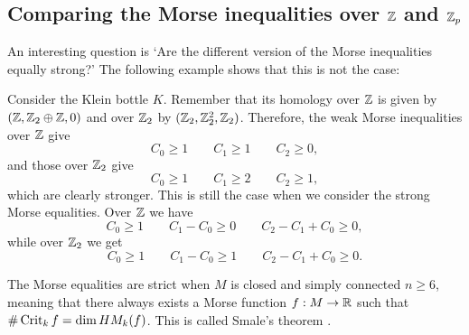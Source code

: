 \subsection{Comparing the Morse inequalities over $\Z$ and $\Z_p$}

An interesting question is `Are the different version of the Morse inequalities equally strong?'
The following example shows that this is not the case:

\begin{eg}
    Consider the Klein bottle $K$.
    Remember that its homology over $\Z$ is given by $(\Z, \Z_2 \oplus \Z, 0)$ and over $ \Z_2$ by $(\Z_2, \Z_2^2, \Z_2)$.
    Therefore, the weak Morse inequalities over $\Z$ give
    \[
    C_0 \ge 1 \qquad C_1 \ge 1 \qquad C_2 \ge 0
    ,\] 
    and those over $\Z_2$ give
    \[
    C_0 \ge  1 \qquad C_1 \ge  2 \qquad C_2 \ge  1
    ,\] 
    which are clearly stronger.
    This is still the case when we consider the strong Morse equalities. Over $ \Z$ we have
    \[
    C_0 \ge  1 \qquad C_1 - C_0 \ge  0 \qquad C_2 - C_1 + C_0 \ge  0
    ,\] 
    while over $\Z_2$ we get
    \[
    C_0 \ge  1 \qquad C_1 - C_0 \ge  1 \qquad C_2 - C_1 + C_0 \ge  0
    .\] 
\end{eg}

\begin{remark}
    The Morse equalities are strict when $M$ is closed and simply connected $n\ge 6$, meaning that there always exists a Morse function $f: M \to  \R$ such that $\# \Crit_k f = \dim \HMf[k]f$. This is called Smale's theorem .
\end{remark}




